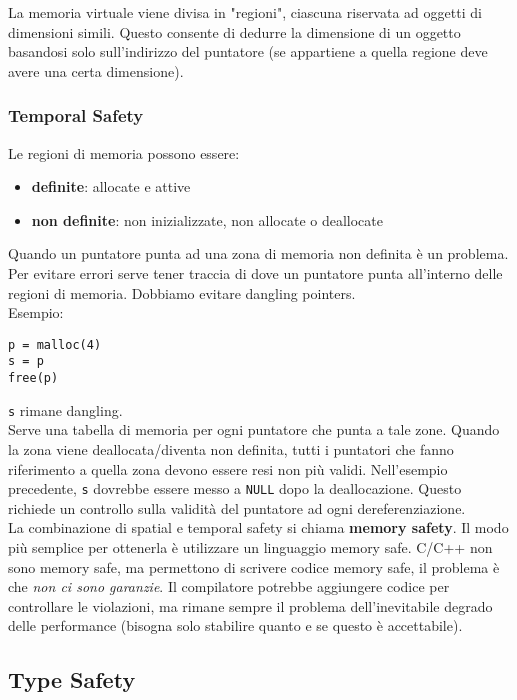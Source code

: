 La memoria virtuale viene divisa in "regioni", ciascuna riservata ad oggetti di dimensioni simili. Questo consente di dedurre la dimensione di un oggetto basandosi solo sull'indirizzo del puntatore (se appartiene a quella regione deve avere una certa dimensione).\\


\subsubsection{Temporal Safety}
Le regioni di memoria possono essere: 
\begin{itemize}
	\item \textbf{definite}: allocate e attive
	\item \textbf{non definite}: non inizializzate, non allocate o deallocate
\end{itemize}

Quando un puntatore punta ad una zona di memoria non definita è un problema. Per evitare errori serve tener traccia di dove un puntatore punta all'interno delle regioni di memoria. Dobbiamo evitare dangling pointers.\\
Esempio: 
\begin{verbatim}
p = malloc(4)
s = p
free(p)
\end{verbatim}
\texttt{s} rimane dangling.\\

Serve una tabella di memoria per ogni puntatore che punta a tale zone. Quando la zona viene deallocata/diventa non definita, tutti i puntatori che fanno riferimento a quella zona devono essere resi non più validi. Nell'esempio precedente, \texttt{s} dovrebbe essere messo a \texttt{NULL} dopo la deallocazione. Questo richiede un controllo sulla validità del puntatore ad ogni dereferenziazione.\\

La combinazione di spatial e temporal safety si chiama \textbf{memory safety}. Il modo più semplice per ottenerla è utilizzare un linguaggio memory safe. C/C++ non sono memory safe, ma permettono di scrivere codice memory safe, il problema è che \textit{non ci sono garanzie}. Il compilatore potrebbe aggiungere codice per controllare le violazioni, ma rimane sempre il problema dell'inevitabile degrado delle performance (bisogna solo stabilire quanto e  se questo è accettabile).\\


\subsection{Type Safety}

